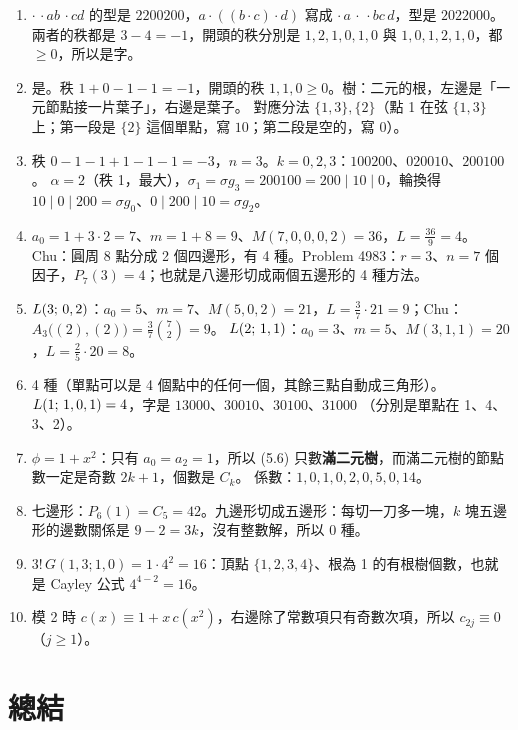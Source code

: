 \begin{enumerate}[leftmargin=1.8em,label=\textbf{\arabic*.}]
  \item $\cdot\,\cdot ab\,\cdot cd$ 的型是 $2200200$，$a\cdot((b\cdot c)\cdot d)$ 寫成 $\cdot\,a\,\cdot\,\cdot bc\,d$，型是 $2022000$。
        兩者的秩都是 $3-4=-1$，開頭的秩分別是 $1,2,1,0,1,0$ 與 $1,0,1,2,1,0$，都 $\ge0$，所以是字。
  \item 是。秩 $1+0-1-1=-1$，開頭的秩 $1,1,0\ge0$。樹：二元的根，左邊是「一元節點接一片葉子」，右邊是葉子。
        對應分法 $\{1,3\},\{2\}$（點 1 在弦 $\{1,3\}$ 上；第一段是 $\{2\}$ 這個單點，寫 $10$；第二段是空的，寫 $0$）。
  \item 秩 $0-1-1+1-1-1=-3$，$n=3$。$k=0,2,3$：$100200$、$020010$、$200100$。
        $\alpha=2$（秩 1，最大），$\sigma_1=\sigma g_3=200100=200\mid10\mid0$，輪換得 $10\mid0\mid200=\sigma g_0$、$0\mid200\mid10=\sigma g_2$。
  \item $a_0=1+3\cdot2=7$、$m=1+8=9$、$M(7,0,0,0,2)=36$，$L=\frac{36}{9}=4$。
        Chu：圓周 8 點分成 2 個四邊形，有 4 種。Problem 4983：$r=3$、$n=7$ 個因子，$P_7(3)=4$；也就是八邊形切成兩個五邊形的 4 種方法。
  \item $L(3;\,0,2)$：$a_0=5$、$m=7$、$M(5,0,2)=21$，$L=\frac37\cdot21=9$；Chu：$A_3\big((2),(2)\big)=\frac37\binom72=9$。
        $L(2;\,1,1)$：$a_0=3$、$m=5$、$M(3,1,1)=20$，$L=\frac25\cdot20=8$。
  \item 4 種（單點可以是 4 個點中的任何一個，其餘三點自動成三角形）。$L(1;\,1,0,1)=4$，字是 $13000$、$30010$、$30100$、$31000$
        （分別是單點在 1、4、3、2）。
  \item $\phi=1+x^2$：只有 $a_0=a_2=1$，所以 (5.6) 只數\textbf{滿二元樹}，而滿二元樹的節點數一定是奇數 $2k+1$，個數是 $C_k$。
        係數：$1,0,1,0,2,0,5,0,14$。
  \item 七邊形：$P_6(1)=C_5=42$。九邊形切成五邊形：每切一刀多一塊，$k$ 塊五邊形的邊數關係是 $9-2=3k$，沒有整數解，所以 0 種。
  \item $3!\,G(1,3;1,0)=1\cdot4^2=16$：頂點 $\{1,2,3,4\}$、根為 1 的有根樹個數，也就是 Cayley 公式 $4^{4-2}=16$。
  \item 模 2 時 $c(x)\equiv1+x\,c(x^2)$，右邊除了常數項只有奇數次項，所以 $c_{2j}\equiv0$（$j\ge1$）。
\end{enumerate}

\section{總結}\label{sec:summary}

